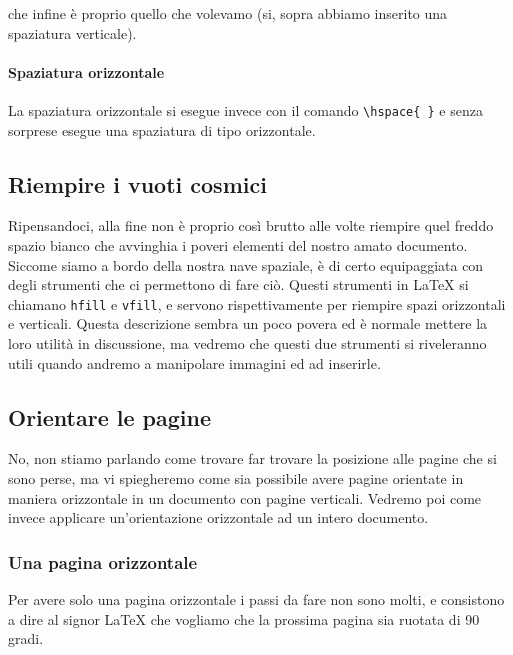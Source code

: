 \vspace{25px}

\noindent che infine è proprio quello che volevamo (si, sopra abbiamo inserito 
una spaziatura verticale).

\paragraph*{Spaziatura orizzontale} La spaziatura orizzontale si esegue invece 
con il comando \verb!\hspace{ }! e senza sorprese esegue una spaziatura di tipo 
orizzontale.

\subsection{Riempire i vuoti cosmici}

Ripensandoci, alla fine non è proprio così brutto alle volte riempire quel 
freddo spazio bianco che avvinghia i poveri elementi del nostro amato 
documento. Siccome siamo a bordo della nostra nave spaziale, è di certo 
equipaggiata con degli strumenti che ci permettono di fare ciò. Questi 
strumenti in \LaTeX{} si chiamano \texttt{hfill} e \texttt{vfill}, e servono 
rispettivamente per riempire spazi orizzontali e verticali. Questa descrizione 
sembra un poco povera ed è normale mettere la loro utilità in discussione, ma 
vedremo che questi due strumenti si riveleranno utili quando andremo a 
manipolare immagini ed ad inserirle.

\subsection{Orientare le pagine}

No, non stiamo parlando come trovare far trovare la posizione alle pagine che si 
sono perse, ma vi spiegheremo come sia possibile avere pagine orientate in 
maniera orizzontale in un documento con pagine verticali. Vedremo poi come 
invece applicare un'orientazione orizzontale ad un intero documento.

\subsubsection{Una pagina orizzontale}

Per avere solo una pagina orizzontale i passi da fare non sono molti, e 
consistono a dire al signor \LaTeX{} che vogliamo che la prossima pagina sia 
ruotata di 90 gradi.

